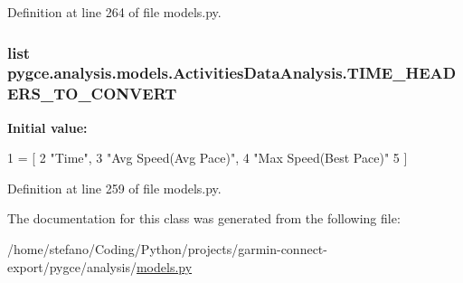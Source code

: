 Definition at line 264 of file models.\+py.

\subsubsection[{\texorpdfstring{T\+I\+M\+E\+\_\+\+H\+E\+A\+D\+E\+R\+S\+\_\+\+T\+O\+\_\+\+C\+O\+N\+V\+E\+RT}{TIME_HEADERS_TO_CONVERT}}]{\setlength{\rightskip}{0pt plus 5cm}list pygce.\+analysis.\+models.\+Activities\+Data\+Analysis.\+T\+I\+M\+E\+\_\+\+H\+E\+A\+D\+E\+R\+S\+\_\+\+T\+O\+\_\+\+C\+O\+N\+V\+E\+RT\hspace{0.3cm}{\ttfamily [static]}}\hypertarget{classpygce_1_1analysis_1_1models_1_1_activities_data_analysis_a2f0ccc7899b8c6b6d94391c80f5def1d}{}\label{classpygce_1_1analysis_1_1models_1_1_activities_data_analysis_a2f0ccc7899b8c6b6d94391c80f5def1d}
{\bfseries Initial value\+:}
\begin{DoxyCode}
1 = [
2         \textcolor{stringliteral}{"Time"},
3         \textcolor{stringliteral}{"Avg Speed(Avg Pace)"},
4         \textcolor{stringliteral}{"Max Speed(Best Pace)"}
5     ]
\end{DoxyCode}


Definition at line 259 of file models.\+py.



The documentation for this class was generated from the following file\+:\begin{DoxyCompactItemize}
\item 
/home/stefano/\+Coding/\+Python/projects/garmin-\/connect-\/export/pygce/analysis/\hyperlink{models_8py}{models.\+py}\end{DoxyCompactItemize}
